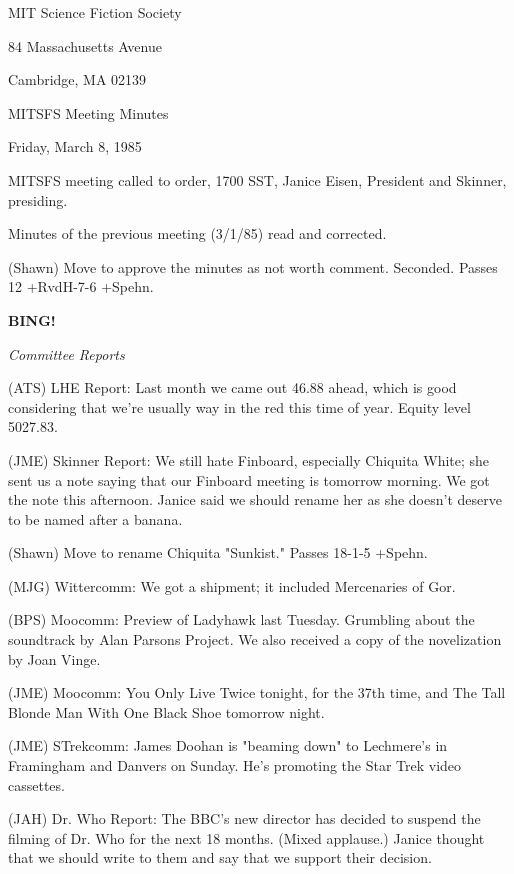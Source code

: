 \documentclass[12pt]{article}
\newcommand{\bing}{{\bf BING!} }
\newcommand{\goto}[1]{\bing \vskip 12pt \centerline{{\em{#1}}}}
\begin{document}
\begin{center}

MIT Science Fiction Society 

84 Massachusetts Avenue

Cambridge, MA 02139

\vspace{12pt}

MITSFS Meeting Minutes 

Friday, March 8, 1985

\end{center}
 
\vspace{18pt}

\setlength{\parskip}{6pt}

\noindent
MITSFS meeting called to order, 1700 SST,
Janice Eisen, President and Skinner, presiding.

Minutes of the previous meeting (3/1/85) read and corrected.

(Shawn) Move to approve the minutes as not worth comment. Seconded. Passes 12 +RvdH-7-6 +Spehn.

\goto{Committee Reports}

(ATS) LHE Report: Last month we came out 46.88 ahead, which is good considering that we're usually way in the red this time of year. Equity level 5027.83.

(JME) Skinner Report: We still hate Finboard, especially Chiquita White; she sent us a note saying that our Finboard meeting is tomorrow morning. We got the note this afternoon. Janice said we should rename her as she doesn't deserve to be named after a banana.

(Shawn) Move to rename Chiquita "Sunkist." Passes 18-1-5 +Spehn.

(MJG) Wittercomm: We got a shipment; it included Mercenaries of Gor.

(BPS) Moocomm: Preview of Ladyhawk last Tuesday. Grumbling about the soundtrack by Alan Parsons Project. We also received a copy of the novelization by Joan Vinge.

(JME) Moocomm: You Only Live Twice tonight, for the 37th time, and The Tall Blonde Man With One Black Shoe tomorrow night.

(JME) STrekcomm: James Doohan is "beaming down" to Lechmere's in Framingham and Danvers on Sunday. He's promoting the Star Trek video cassettes.

(JAH) Dr. Who Report: The BBC's new director has decided to suspend the filming of Dr. Who for the next 18 months. (Mixed applause.) Janice thought that we should write to them and say that we support their decision.
\end{document}

